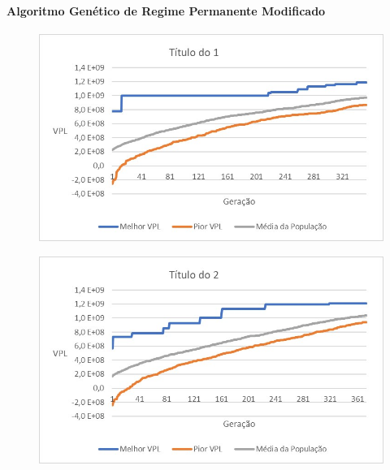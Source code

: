 \documentclass[12pt,a4paper]{report}
\begin{document}
\chapter{}
\subsubsection{Algoritmo Genético de Regime Permanente Modificado}

\begin{figure}[H]
\centering

\includegraphics[scale=1]{ApD/1}

\end{figure}

\begin{figure}[H]
\centering

\includegraphics[scale=1]{ApD/2}

\end{figure}
\end{document}
